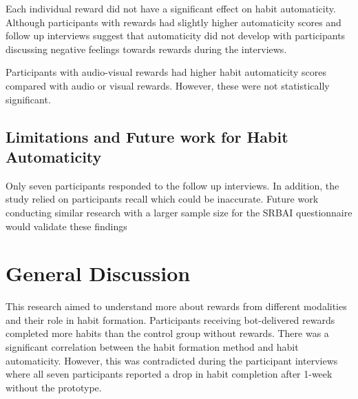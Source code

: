 \documentclass{scaffold/sigchi}
\begin{document}
Each individual reward did not have a significant effect on habit automaticity. Although participants with rewards had slightly higher automaticity scores and follow up interviews suggest that automaticity did not develop with participants discussing negative feelings towards rewards during the interviews.  

Participants with audio-visual rewards had higher habit automaticity scores compared with audio or visual rewards. However, these were not statistically significant.

\subsection{Limitations and Future work for Habit Automaticity}
Only seven participants responded to the follow up interviews. In addition, the study relied on participants recall which could be inaccurate. Future work conducting similar research with a larger sample size for the SRBAI questionnaire would validate these findings

\section{General Discussion}
This research aimed to understand more about rewards from different modalities and their role in habit formation. Participants receiving bot-delivered rewards completed more habits than the control group without rewards. There was a significant correlation between the habit formation method and habit automaticity. However, this was contradicted during the participant interviews where all seven participants reported a drop in habit completion after 1-week without the prototype.

\end{document}
